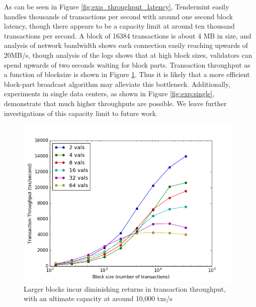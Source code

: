 As can be seen in Figure \ref{fig:exp_throughput_latency}, 
Tendermint easily handles thousands of transactions per second with around one second block latency,
though there appears to be a capacity limit at around ten thousand transactions per second.
A block of 16384 transactions is about 4 MB in size, and analysis of network bandwidth shows each connection
easily reaching upwards of 20MB/s, though analysis of the logs shows that at high block sizes, 
validators can spend upwards of two seconds waiting for block parts.
Transaction throughput as a function of blocksize is shown in Figure \ref{fig:exp:throughput_blocksize}.
Thus it is likely that a more efficient block-part broadcast algorithm may alleviate this bottleneck.
Additionally, experiments in single data centers, as shown in Figure \ref{fig:exp:single},
demonstrate that much higher throughputs are possible. We leave further investigations of this capacity limit to future work.


\begin{figure}[]
	\includegraphics[width=\linewidth,height=\textheight,keepaspectratio]{figures/throughput/throughput-blocksize.png}
    	\centering
	\caption[Throughput-blocksize in non-faulty network]{Larger blocks incur diminishing returns in transaction throughput, with an ultimate capacity at around 10,000 txs/s}
	\label{fig:exp:throughput_blocksize}
\end{figure}

